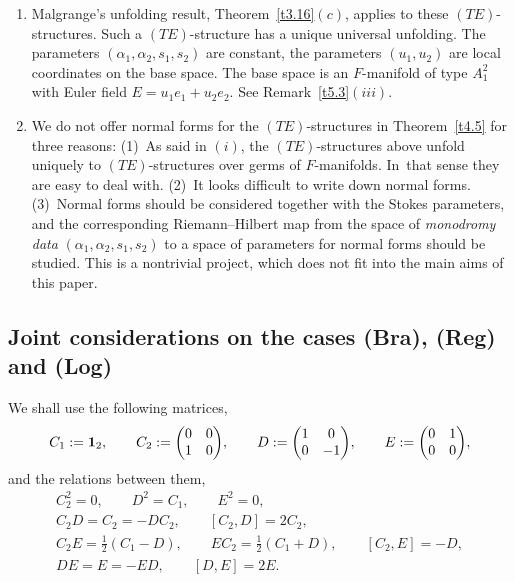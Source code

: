 \documentclass[10pt,a4paper]{amsart}
\numberwithin{equation}{section}
\numberwithin{figure}{section}
\begin{document}
\begin{Remarks}%
\quad
\begin{enumerate}\itemsep=0pt
\item[$(i)$] Malgrange's unfolding result, Theorem~\ref{t3.16}$(c)$,
applies to these $(TE)$-structures.
Such a $(TE)$-structure has a unique universal unfolding.
The parameters $(\alpha_1,\alpha_2,s_1,s_2)$ are constant,
the parameters $(u_1,u_2)$ are local coordinates
on the base space. The base space is an $F$-manifold
of type $A_1^2$ with Euler field $E=u_1e_1+u_2e_2$.
See Remark~\ref{t5.3}$(iii)$.

\item[$(ii)$] We do not offer normal forms for the $(TE)$-structures
in Theorem~\ref{t4.5} for three reasons: (1)~As said in $(i)$,
the $(TE)$-structures above unfold uniquely to
$(TE)$-structures over germs of $F$-manifolds. In~that sense they are easy to deal with.
(2)~It looks difficult to write down normal forms.
(3)~Normal forms should be considered
together with the Stokes parameters, and the corresponding
Riemann--Hilbert map from the space of {\it monodromy data}
$(\alpha_1,\alpha_2,s_1,s_2)$ to a space of
parameters for normal forms should be studied.
This is a nontrivial project,
which does not fit into the main aims of this paper.
\end{enumerate}
\end{Remarks}

\subsection{Joint considerations on the cases (Bra), (Reg) and (Log)}%

\begin{Notation}%
We shall use the following matrices,
\begin{gather*}%
C_1:={\bf 1}_2,\qquad
C_2:=\begin{pmatrix}0&0\\1&0\end{pmatrix}\!,\qquad
D:=\begin{pmatrix}1&0\\0&-1\end{pmatrix}\!,\qquad
E:=\begin{pmatrix}0&1\\0&0\end{pmatrix}\!,
\end{gather*}
and the relations between them,
\begin{gather*}
C_2^2=0,\qquad D^2=C_1,\qquad E^2=0,%
\\[.5ex]
C_2D=C_2=-DC_2,\qquad [C_2,D]=2C_2,%
\\
C_2E=\frac{1}{2}(C_1-D),\qquad
EC_2=\frac{1}{2}(C_1+D),\qquad
[C_2,E]=-D,%
\\
DE=E=-ED,\qquad [D,E]=2E.%
\end{gather*}
\end{Notation}
\end{document}
